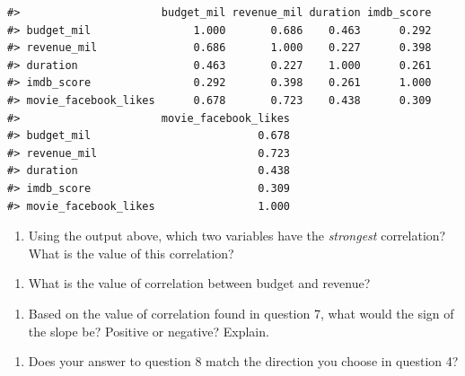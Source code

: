 \documentclass[
]{report}
\providecommand{\tightlist}{%
  \setlength{\itemsep}{0pt}\setlength{\parskip}{0pt}}
\begin{document}
\begin{verbatim}
#>                      budget_mil revenue_mil duration imdb_score
#> budget_mil                1.000       0.686    0.463      0.292
#> revenue_mil               0.686       1.000    0.227      0.398
#> duration                  0.463       0.227    1.000      0.261
#> imdb_score                0.292       0.398    0.261      1.000
#> movie_facebook_likes      0.678       0.723    0.438      0.309
#>                      movie_facebook_likes
#> budget_mil                          0.678
#> revenue_mil                         0.723
#> duration                            0.438
#> imdb_score                          0.309
#> movie_facebook_likes                1.000
\end{verbatim}

\begin{enumerate}
\def\labelenumi{\arabic{enumi}.}
\setcounter{enumi}{5}
\tightlist
\item
  Using the output above, which two variables have the \emph{strongest} correlation? What is the value of this correlation?
\end{enumerate}

\vspace{0.5in}

\begin{enumerate}
\def\labelenumi{\arabic{enumi}.}
\setcounter{enumi}{6}
\tightlist
\item
  What is the value of correlation between budget and revenue?
\end{enumerate}

\vspace{0.3in}

\begin{enumerate}
\def\labelenumi{\arabic{enumi}.}
\setcounter{enumi}{7}
\tightlist
\item
  Based on the value of correlation found in question 7, what would the sign of the slope be? Positive or negative? Explain.
\end{enumerate}

\vspace{0.5in}

\begin{enumerate}
\def\labelenumi{\arabic{enumi}.}
\setcounter{enumi}{8}
\tightlist
\item
  Does your answer to question 8 match the direction you choose in question 4?
\end{enumerate}

\vspace{0.2in}
\end{document}
